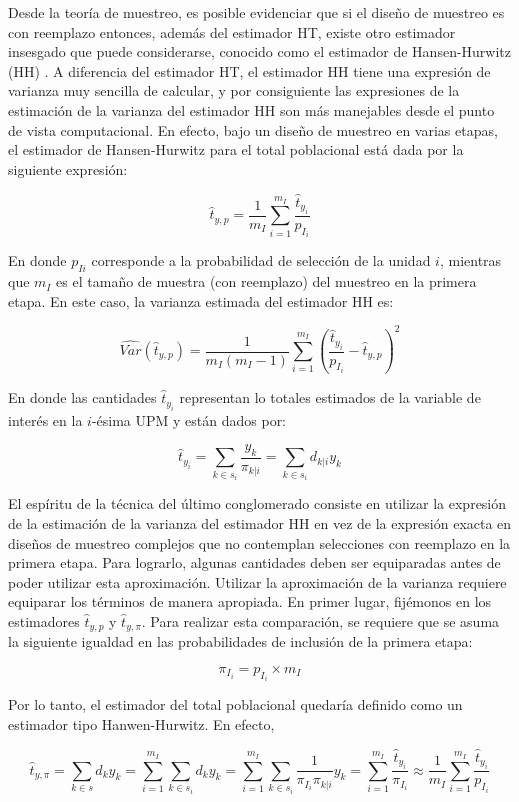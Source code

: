 \documentclass[
  12pt,
  spanish,
]{book}
\begin{document}
Desde la teoría de muestreo, es posible evidenciar que si el diseño de muestreo es con reemplazo entonces, además del estimador HT, existe otro estimador insesgado que puede considerarse, conocido como el estimador de Hansen-Hurwitz (HH) \citep{Gutierrez_2016}. A diferencia del estimador HT, el estimador HH tiene una expresión de varianza muy sencilla de calcular, y por consiguiente las expresiones de la estimación de la varianza del estimador HH son más manejables desde el punto de vista computacional. En efecto, bajo un diseño de muestreo en varias etapas, el estimador de Hansen-Hurwitz para el total poblacional está dada por la siguiente expresión:

\[
\hat{t}_{y,p}=\frac{1}{m_I}\sum_{i=1}^{m_I}\frac{\hat{t}_{y_i}}{p_{I_i}}
\]

En donde \(p_{Ii}\) corresponde a la probabilidad de selección de la unidad \(i\), mientras que \(m_I\) es el tamaño de muestra (con reemplazo) del muestreo en la primera etapa. En este caso, la varianza estimada del estimador HH es:

\[
\widehat{Var}(\hat{t}_{y,p})=\frac{1}{m_I(m_I-1)}\sum_{i=1}^{m_I}\left(\frac{\hat{t}_{y_i}}{p_{I_i}}-\hat{t}_{y,p}\right)^2
\]

En donde las cantidades \(\hat{t}_{y_i}\) representan lo totales estimados de la variable de interés en la \(i\)-ésima UPM y están dados por:

\[
\hat{t}_{y_i} = \sum_{k \in s_i} \frac{y_k}{\pi_{k|i}}
= \sum_{k \in s_i} d_{k|i} y_k 
\]

El espíritu de la técnica del último conglomerado consiste en utilizar la expresión de la estimación de la varianza del estimador HH en vez de la expresión exacta en diseños de muestreo complejos que no contemplan selecciones con reemplazo en la primera etapa. Para lograrlo, algunas cantidades deben ser equiparadas antes de poder utilizar esta aproximación.
Utilizar la aproximación de la varianza requiere equiparar los términos de manera apropiada. En primer lugar, fijémonos en los estimadores \(\hat{t}_{y,p}\) y \(\hat{t}_{y,\pi}\). Para realizar esta comparación, se requiere que
se asuma la siguiente igualdad en las probabilidades de inclusión de la primera etapa:

\[
\pi_{I_i} = p_{I_i} \times m_I 
\]

Por lo tanto, el estimador del total poblacional quedaría definido como un estimador tipo Hanwen-Hurwitz. En efecto,

\[
\hat{t}_{y,\pi} =\sum_{k\in s} d_k y_k  
= \sum_{i=1}^{m_I}\sum_{k \in s_i} d_k y_k 
= \sum_{i=1}^{m_I}\sum_{k \in s_i} \frac{1}{\pi_{I_i} \pi_{k|i}} y_k 
= \sum_{i=1}^{m_I}\frac{\hat{t}_{y_i}}{\pi_{I_i}} 
\approx \frac{1}{m_I}\sum_{i=1}^{m_I}\frac{\hat{t}_{y_i}}{p_{I_i}}
\]
\end{document}
